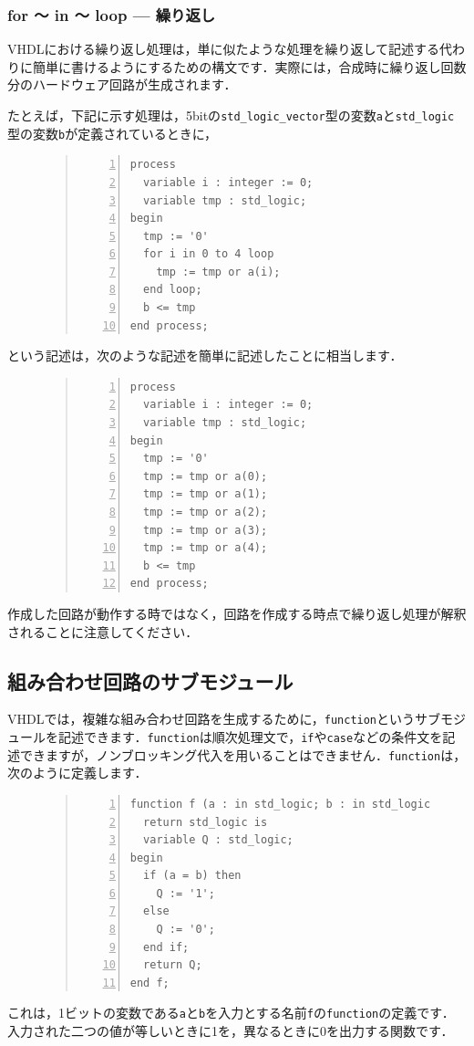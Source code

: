 \documentclass[a4paper,dvipdfmx]{jsarticle}
\begin{document}
\subsubsection{for 〜 in 〜 loop --- 繰り返し}
VHDLにおける繰り返し処理は，単に似たような処理を繰り返して記述する代わりに簡単に書けるようにするための構文です．実際には，合成時に繰り返し回数分のハードウェア回路が生成されます．

たとえば，下記に示す処理は，5bitの\verb|std_logic_vector|型の変数\verb|a|と\verb|std_logic|型の変数\verb|b|が定義されているときに，
\begin{figure}[H]
\begin{quote}
\begin{Verbatim}[frame=single, numbers=left, baselinestretch=0.8]
process
  variable i : integer := 0;
  variable tmp : std_logic;
begin
  tmp := '0'
  for i in 0 to 4 loop
    tmp := tmp or a(i);
  end loop;
  b <= tmp
end process;
\end{Verbatim}
\end{quote}
\end{figure}
という記述は，次のような記述を簡単に記述したことに相当します．
\begin{figure}[H]
\begin{quote}
\begin{Verbatim}[frame=single, numbers=left, baselinestretch=0.8]
process
  variable i : integer := 0;
  variable tmp : std_logic;
begin
  tmp := '0'
  tmp := tmp or a(0);
  tmp := tmp or a(1);
  tmp := tmp or a(2);
  tmp := tmp or a(3);
  tmp := tmp or a(4);
  b <= tmp
end process;
\end{Verbatim}
\end{quote}
\end{figure}
作成した回路が動作する時ではなく，回路を作成する時点で繰り返し処理が解釈されることに注意してください．

\subsection{組み合わせ回路のサブモジュール}
VHDLでは，複雑な組み合わせ回路を生成するために，\verb|function|というサブモジュールを記述できます．\verb|function|は順次処理文で，\verb|if|や\verb|case|などの条件文を記述できますが，ノンブロッキング代入を用いることはできません．\verb|function|は，次のように定義します．
\begin{figure}[H]
\begin{quote}
\begin{Verbatim}[frame=single, numbers=left, baselinestretch=0.8]
function f (a : in std_logic; b : in std_logic)
  return std_logic is
  variable Q : std_logic;
begin
  if (a = b) then
    Q := '1';
  else
    Q := '0';
  end if;
  return Q;
end f;
\end{Verbatim}
\end{quote}
\end{figure}
これは，1ビットの変数である\verb|a|と\verb|b|を入力とする名前\verb|f|の\verb|function|の定義です．入力された二つの値が等しいときに1を，異なるときに0を出力する関数です．
\end{document}
